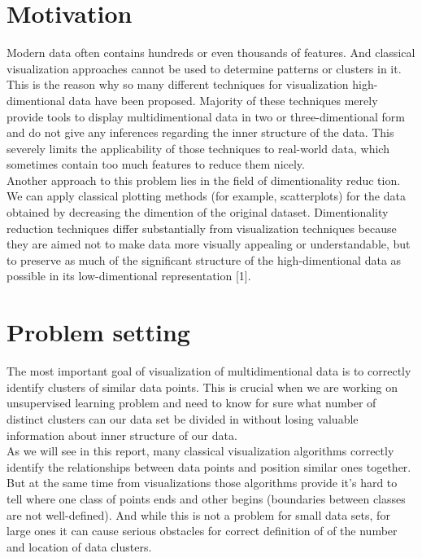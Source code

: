 \section{Motivation}

Modern data often contains hundreds or even thousands of features. And classical visualization approaches cannot be used to determine patterns or clusters in it. This is the reason why so many different techniques for visualization high-dimentional data have been proposed. Majority of these techniques merely provide tools to display multidimentional data in two or three-dimentional form and do not give any inferences regarding the inner structure of the data. This severely limits the applicability of those techniques to real-world data, which sometimes contain too much features to reduce them nicely.\\

Another approach to this problem lies in the field of dimentionality reduc tion. We can apply classical plotting methods (for example, scatterplots) for the data obtained by decreasing the dimention of the original dataset. Dimentionality reduction techniques differ substantially from visualization techniques because they are aimed not to make data more visually appealing or understandable, but to preserve as much of the significant structure of the high-dimentional data as possible in its low-dimentional representation [1].

\section{Problem setting}

The most important goal of visualization of multidimentional data is to correctly identify clusters of similar data points. This is crucial when we are working on unsupervised learning problem and need to know for sure what number of distinct clusters can our data set be divided in without losing valuable information about inner structure of our data.\\

 As we will see in this report, many classical visualization algorithms correctly identify the relationships between data points and position similar ones together. But at the same time from visualizations those algorithms provide it's hard to tell where one class of points ends and other begins (boundaries between classes are not well-defined). And while this is not a problem for small data sets, for large ones it can cause serious obstacles for correct definition of of the number and location of data clusters. \\

